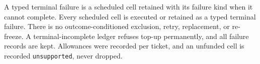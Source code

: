 A typed terminal failure is a scheduled cell retained with its failure kind when it cannot complete. Every scheduled cell is executed or retained as a typed terminal failure. There is no outcome-conditioned exclusion, retry, replacement, or re-freeze. A terminal-incomplete ledger refuses top-up permanently, and all failure records are kept. Allowances were recorded per ticket, and an unfunded cell is recorded \texttt{unsupported}, never dropped.



